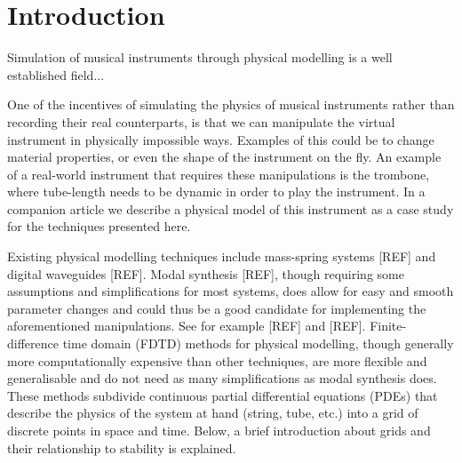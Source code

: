 \documentclass[preprint]{JASA}
\begin{document}
\section{\label{sec:1} Introduction}
Simulation of musical instruments through physical modelling is a well established field...




One of the incentives of simulating the physics of musical instruments rather than recording their real counterparts, is that we can manipulate the virtual instrument in physically impossible ways. Examples of this could be to change material properties, or even the shape of the instrument on the fly. An example of a real-world instrument that requires these manipulations is the trombone, where tube-length needs to be dynamic in order to play the instrument. In a companion article we describe a physical model of this instrument as a case study for the techniques presented here. 

Existing physical modelling techniques include mass-spring systems [REF] and digital waveguides [REF]. Modal synthesis [REF], though requiring some assumptions and simplifications for most systems, does allow for easy and smooth parameter changes and could thus be a good candidate for implementing the aforementioned manipulations. See for example [REF] and [REF]. Finite-difference time domain (FDTD) methods for physical modelling, though generally more computationally expensive than other techniques, are more flexible and generalisable and do not need as many simplifications as modal synthesis does. These methods subdivide continuous partial differential equations (PDEs) that describe the physics of the system at hand (string, tube, etc.) into a grid of discrete points in space and time. Below, a brief introduction about grids and their relationship to stability is explained.
\end{document}
